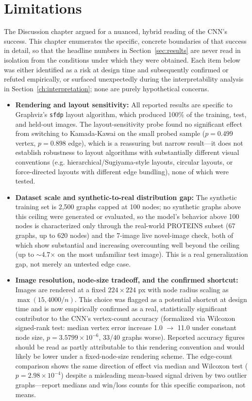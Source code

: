 \documentclass[11pt,letterpaper]{article}
\numberwithin{equation}{section}
\numberwithin{figure}{section}
\numberwithin{table}{section}
\begin{document}
\section{Limitations}
\label{sec:limitations}
The Discussion chapter argued for a nuanced, hybrid reading of the CNN's success. This chapter enumerates the specific, concrete boundaries of that success in detail, so that the headline numbers in Section~\ref{sec:results} are never read in isolation from the conditions under which they were obtained. Each item below was either identified as a risk at design time and subsequently confirmed or refuted empirically, or surfaced unexpectedly during the interpretability analysis in Section~\ref{ch:interpretation}; none are purely hypothetical concerns.
\begin{itemize}
    \item \textbf{Rendering and layout sensitivity:} All reported results are specific to Graphviz's \texttt{sfdp} layout algorithm, which produced 100\% of the training, test, and held-out images. The layout-sensitivity probe found no significant effect from switching to Kamada-Kawai on the small probed sample ($p=0.499$ vertex, $p=0.898$ edge), which is a reassuring but narrow result---it does not establish robustness to layout algorithms with substantially different visual conventions (e.g. hierarchical/Sugiyama-style layouts, circular layouts, or force-directed layouts with different edge bundling), none of which were tested.
    \item \textbf{Dataset scale and synthetic-to-real distribution gap:} The synthetic training set is 2,500 graphs capped at 100 nodes; no synthetic graphs above this ceiling were generated or evaluated, so the model's behavior above 100 nodes is characterized only through the real-world PROTEINS subset (67 graphs, up to 620 nodes) and the 7-image live novel-image check, both of which show substantial and increasing overcounting well beyond the ceiling (up to $\sim$4.7$\times$ on the most unfamiliar test image). This is a real generalization gap, not merely an untested edge case.
    \item \textbf{Image resolution, node-size tradeoff, and the confirmed shortcut:} Images are rendered at a fixed $224 \times 224$ px with node radius scaling as $\max(15, 4000/n)$. This choice was flagged as a potential shortcut at design time and is now empirically confirmed as a real, statistically significant contributor to the CNN's vertex-count accuracy (formalized via Wilcoxon signed-rank test: median vertex error increase 1.0 $\rightarrow$ 11.0 under constant node size, $p=3.5799 \times 10^{-6}$, 33/40 graphs worse). Reported accuracy figures should be read as partly attributable to this rendering convention and would likely be lower under a fixed-node-size rendering scheme. The edge-count comparison shows the same direction of effect via median and Wilcoxon test ($p=2.98 \times 10^{-4}$) despite a misleading mean-based signal driven by two outlier graphs---report medians and win/loss counts for this specific comparison, not means.

\end{itemize}
\end{document}
